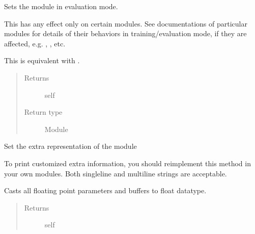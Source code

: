 \documentclass[letterpaper,10pt,english]{sphinxmanual}
\begin{document}
\begin{fulllineitems}

\begin{fulllineitems}
\label{\detokenize{api/autoencoding:geology.metamodelling.SpatialAutoencoder.eval}}
Sets the module in evaluation mode.

This has any effect only on certain modules. See documentations of
particular modules for details of their behaviors in training/evaluation
mode, if they are affected, e.g. , ,
etc.

This is equivalent with .
\begin{quote}\begin{description}
\item[{Returns}] \leavevmode
self

\item[{Return type}] \leavevmode
Module

\end{description}\end{quote}

\end{fulllineitems}


\begin{fulllineitems}
\label{\detokenize{api/autoencoding:geology.metamodelling.SpatialAutoencoder.extra_repr}}
Set the extra representation of the module

To print customized extra information, you should reimplement
this method in your own modules. Both single\sphinxhyphen{}line and multi\sphinxhyphen{}line
strings are acceptable.

\end{fulllineitems}


\begin{fulllineitems}
\label{\detokenize{api/autoencoding:geology.metamodelling.SpatialAutoencoder.float}}
Casts all floating point parameters and buffers to float datatype.
\begin{quote}\begin{description}
\item[{Returns}] \leavevmode
self


\end{description}
\end{quote}
\end{fulllineitems}
\end{fulllineitems}
\end{document}
